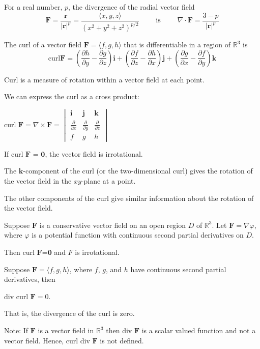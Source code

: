 \documentclass[../calc3.tex]{subfiles}
\begin{document}
\begin{theorem}
    For a real number, $p$, the divergence of the radial vector field 
    \[\textbf{F}=\frac{\textbf{r}}{|\textbf{r}|^p}=\frac{\langle x,y,z\rangle}{(x^2+y^2+z^2)^{p/2}} \qquad \text{ is } \qquad \nabla \cdot \textbf{F} = \frac{3-p}{|\textbf{r}|^p}\]
\end{theorem}

\begin{definition}[Curl]
    The curl of a vector field $\textbf{F} = \langle f,g,h \rangle$ that is differentiable in a region of $\mathbb{R}^3$ is 
    \[\text{curl}\textbf{F} = \left(\frac{\partial h}{\partial y}-\frac{\partial g}{\partial z}\right)\textbf{i} + \left(\frac{\partial f}{\partial z}-\frac{\partial h}{\partial x}\right)\textbf{j}+\left(\frac{\partial g}{\partial x}-\frac{\partial f}{\partial y}\right)\textbf{k}\]

    Curl is a measure of rotation within a vector field at each point. 

    We can express the curl as a cross product:

    curl $\textbf{F} = \nabla \times \textbf{F} = \begin{vmatrix}
        \textbf{i} & \textbf{j} & \textbf{k} \\
        \frac{\partial}{\partial x} & \frac{\partial}{\partial y} & \frac{\partial}{\partial z}\\
        f & g & h
    \end{vmatrix}$

    If curl $\textbf{F = 0}$, the vector field is irrotational.
\end{definition}

The $\textbf{k}$-component of the curl (or the two-dimensional curl) gives the rotation of the vector field in the $xy$-plane at a point. 

The other components of the curl give similar information about the rotation of the vector field.

\begin{theorem}
    Suppose $\textbf{F}$ is a conservative vector field on an open region $D$ of $\mathbb{R}^3$. Let $\textbf{F}=\nabla\varphi$, where $\varphi$ 
    is a potential function with continuous second partial derivatives on $D$.

    Then curl $\textbf{F=0}$ and $F$ is irrotational.
\end{theorem}

\begin{theorem}
    Suppose $\textbf{F}=\langle f,g,h\rangle$, where $f$, $g$, and $h$ have continuous second partial derivatives, then 
    \begin{center}
        div curl $\textbf{F} = 0$.
    \end{center}

    That is, the divergence of the curl is zero.

    Note: If $\textbf{F}$ is a vector field in $\mathbb{R}^3$ then div $\textbf{F}$ is a scalar valued function and not a vector field. Hence, curl div $\textbf{F}$ is not defined.
\end{theorem}
\end{document}
